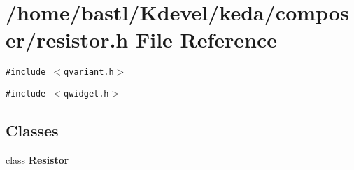 \section{/home/bastl/Kdevel/keda/composer/resistor.h File Reference}
\label{resistor_8h}
{\tt \#include $<$qvariant.h$>$}\par
{\tt \#include $<$qwidget.h$>$}\par
\subsection*{Classes}
\begin{CompactItemize}
\item 
class {\bf Resistor}
\end{CompactItemize}
